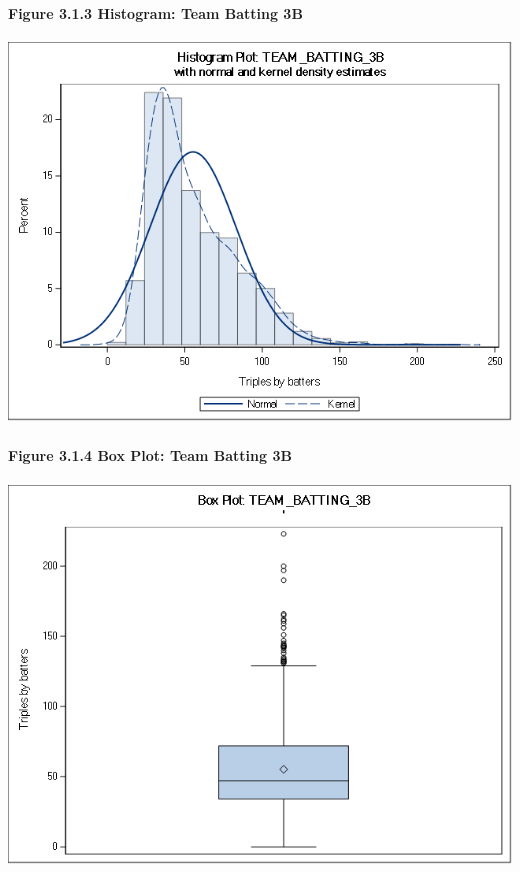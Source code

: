 \documentclass[]{article}
\let\oldparagraph\paragraph
\renewcommand{\paragraph}[1]{\oldparagraph{#1}\mbox{}}
\begin{document}
\newpage

\paragraph{Figure 3.1.3 Histogram: Team Batting
3B}\label{figure-3.1.3-histogram-team-batting-3b}

\includegraphics[height=3.95833in]{images/hist_team_batting_3b.png}

\paragraph{Figure 3.1.4 Box Plot: Team Batting
3B}\label{figure-3.1.4-box-plot-team-batting-3b}

\includegraphics[height=3.95833in]{images/box_team_batting_3b.png}
\end{document}
